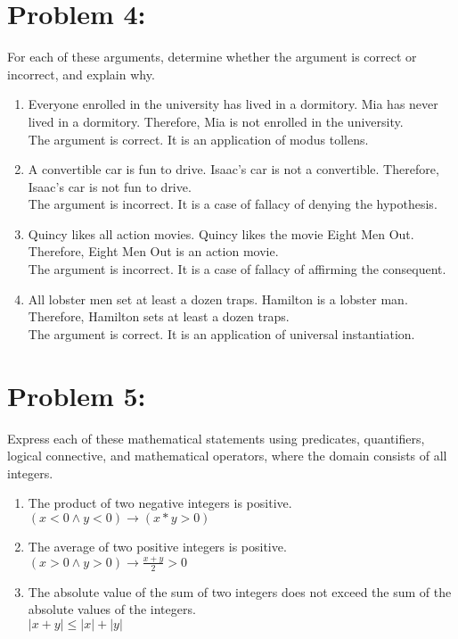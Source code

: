 \documentclass[12pt,en,a4paper]{report}
\begin{document}
	\section*{Problem 4:}
	For each of these arguments, determine whether the argument is correct or incorrect, and explain why.
	\begin{enumerate}
		\item Everyone enrolled in the university has lived in a dormitory. Mia has never lived in a dormitory. Therefore, Mia is not enrolled in the university.\\
		
		The argument is correct. It is an application of modus tollens.
		\item A convertible car is fun to drive. Isaac's car is not a convertible. Therefore, Isaac's car is not fun to drive.\\
		
		The argument is incorrect. It is a case of fallacy of denying the hypothesis.
		\item Quincy likes all action movies. Quincy likes the movie Eight Men Out. Therefore, Eight Men Out is an action movie.\\
		
		The argument is incorrect. It is a case of fallacy of affirming the consequent.
		\item All lobster men set at least a dozen traps. Hamilton is a lobster man. Therefore, Hamilton sets at least a dozen traps.\\
		
		The argument is correct. It is an application of universal instantiation.
	\end{enumerate}
\newpage
{}
	\section*{Problem 5:}
	Express each of these mathematical statements using predicates, quantifiers, logical connective, and mathematical operators, where the domain consists of all integers.
	\begin{enumerate}
		\item The product of two negative integers is positive.\\
		$(x<0 \wedge y<0) \rightarrow (x*y>0)$
		\item The average of two positive integers is positive.\\
		$(x>0 \wedge y>0) \rightarrow \frac{x+y}{2} > 0$
		\item The absolute value of the sum of two integers does not exceed the sum of the absolute values of the integers.\\
		$|x+y| \leq |x|+|y|$
	\end{enumerate}
\newpage
{}
\end{document}
